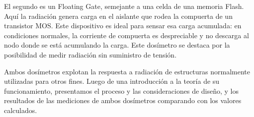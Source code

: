 El segundo es un Floating Gate,
semejante a una celda de una memoria Flash.
Aquí la radiación genera carga en el aislante que rodea la compuerta de un
transistor MOS.
Este dispositivo es ideal para sensar esa carga acumulada:
en condiciones normales, la corriente de compuerta es despreciable 
y no descarga al nodo donde se está acumulando la carga.
Este dosímetro se destaca por la posibilidad de medir radiación sin suministro de tensión.

Ambos dosímetros explotan la respuesta a radiación de estructuras 
normalmente utilizadas para otros fines. 
Luego de una introducción a la teoría de su funcionamiento,
presentamos el proceso y las consideraciones de diseño,
y los resultados de las mediciones de ambos dosímetros 
comparando con los valores calculados.
